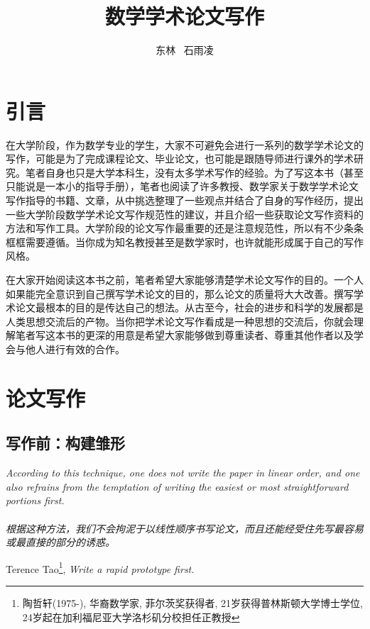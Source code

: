 \documentclass{formatBook}
\begin{document}
\title{数学学术论文写作}
\author{东林 \ 石雨凌}
\maketitle
\tableofcontents

\newpage
\chapter{引言}
在大学阶段，作为数学专业的学生，大家不可避免会进行一系列的数学学术论文的写作，可能是为了完成课程论文、毕业论文，也可能是跟随导师进行课外的学术研究。笔者自身也只是大学本科生，没有太多学术写作的经验。为了写这本书（甚至只能说是一本小的指导手册），笔者也阅读了许多教授、数学家关于数学学术论文写作指导的书籍、文章，从中挑选整理了一些观点并结合了自身的写作经历，提出一些大学阶段数学学术论文写作规范性的建议，并且介绍一些获取论文写作资料的方法和写作工具。大学阶段的论文写作最重要的还是注意规范性，所以有不少条条框框需要遵循。当你成为知名教授甚至是数学家时，也许就能形成属于自己的写作风格。

\par 在大家开始阅读这本书之前，笔者希望大家能够清楚学术论文写作的目的。一个人如果能完全意识到自己撰写学术论文的目的，那么论文的质量将大大改善。撰写学术论文最根本的目的是传达自己的想法。从古至今，社会的进步和科学的发展都是人类思想交流后的产物。当你把学术论文写作看成是一种思想的交流后，你就会理解笔者写这本书的更深的用意是希望大家能够做到尊重读者、尊重其他作者以及学会与他人进行有效的合作。

\chapter{论文写作}
\section{写作前：构建雏形}
\noindent \textit{According to this technique, one does not write the paper in linear order, and one also refrains from
    the temptation of writing the easiest or most straightforward portions first. \\ \ \\ 根据这种方法，我们不会拘泥于以线性顺序书写论文，而且还能经受住先写最容易或最直接的部分的诱惑。}
\begin{flushright}
    \cndash Terence Tao\footnote{陶哲轩(1975-), 华裔数学家, 菲尔茨奖获得者, 21岁获得普林斯顿大学博士学位,  24岁起在加利福尼亚大学洛杉矶分校担任正教授}, \textit{Write a rapid prototype first.}
\end{flushright}
\end{document}
